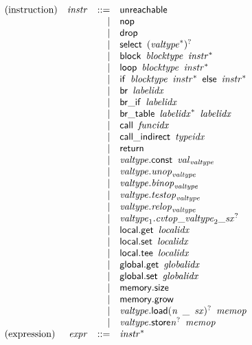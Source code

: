 $$
\begin{array}{@{}lrrl@{}l@{}}
\mbox{(instruction)} & {\mathit{instr}} &::=& \mathsf{unreachable} \\ &&|&
\mathsf{nop} \\ &&|&
\mathsf{drop} \\ &&|&
\mathsf{select}~\,{({{\mathit{valtype}}^\ast})^?} \\ &&|&
\mathsf{block}~\,{\mathit{blocktype}}~\,{{\mathit{instr}}^\ast} \\ &&|&
\mathsf{loop}~\,{\mathit{blocktype}}~\,{{\mathit{instr}}^\ast} \\ &&|&
\mathsf{if}~\,{\mathit{blocktype}}~\,{{\mathit{instr}}^\ast}~\,\mathsf{else}~\,{{\mathit{instr}}^\ast} \\ &&|&
\mathsf{br}~\,{\mathit{labelidx}} \\ &&|&
\mathsf{br\_if}~\,{\mathit{labelidx}} \\ &&|&
\mathsf{br\_table}~\,{{\mathit{labelidx}}^\ast}~\,{\mathit{labelidx}} \\ &&|&
\mathsf{call}~\,{\mathit{funcidx}} \\ &&|&
\mathsf{call\_indirect}~\,{\mathit{typeidx}} \\ &&|&
\mathsf{return} \\ &&|&
{\mathit{valtype}}.\mathsf{const}~\,{{\mathit{val}}}_{{\mathit{valtype}}} \\ &&|&
{\mathit{valtype}} . {{\mathit{unop}}}_{{\mathit{valtype}}} \\ &&|&
{\mathit{valtype}} . {{\mathit{binop}}}_{{\mathit{valtype}}} \\ &&|&
{\mathit{valtype}} . {{\mathit{testop}}}_{{\mathit{valtype}}} \\ &&|&
{\mathit{valtype}} . {{\mathit{relop}}}_{{\mathit{valtype}}} \\ &&|&
{\mathit{valtype}}_{{1}} . {{{{{\mathit{cvtop}}}{\mathsf{\_}}}{{\mathit{valtype}}_{{2}}}}{\mathsf{\_}}}{{{\mathit{sx}}^?}} \\ &&|&
\mathsf{local.get}~\,{\mathit{localidx}} \\ &&|&
\mathsf{local.set}~\,{\mathit{localidx}} \\ &&|&
\mathsf{local.tee}~\,{\mathit{localidx}} \\ &&|&
\mathsf{global.get}~\,{\mathit{globalidx}} \\ &&|&
\mathsf{global.set}~\,{\mathit{globalidx}} \\ &&|&
\mathsf{memory.size} \\ &&|&
\mathsf{memory.grow} \\ &&|&
{{\mathit{valtype}}.\mathsf{load}}{{({\mathit{n}}~\,\mathsf{\_}~\,{\mathit{sx}})^?}}~\,{\mathit{memop}} \\ &&|&
{{\mathit{valtype}}.\mathsf{store}}{{{\mathit{n}}^?}}~\,{\mathit{memop}} \\
\mbox{(expression)} & {\mathit{expr}} &::=& {{\mathit{instr}}^\ast} \\
\end{array}
$$

